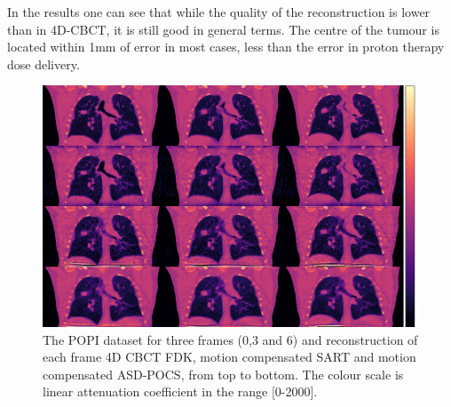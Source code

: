In the results one can see that while the quality of the reconstruction is lower than in 4D-CBCT, it is still good in general terms. The centre of the tumour is located within 1mm of error in most cases, less than the error in proton therapy dose delivery. 


\begin{figure}
\begin{center}

\includegraphics[width=\textwidth]{accuracyMC/MCCBCT3stage.png} 


\end{center}

\caption[Three frames of the motion compensated CBCT recosntruction with different algorithm]{\label{fig:MCCBCT3static} The POPI dataset for three frames (0,3 and 6) and reconstruction of each frame 4D CBCT FDK, motion compensated SART and motion compensated ASD-POCS, from top to bottom.  The colour scale is linear attenuation coefficient in the range [0-2000].} 
\end{figure}

